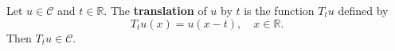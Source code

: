 Let $u \in \mathcal{C}$ and $t \in \mathbb{R}$. The \textbf{translation} of $u$ by $t$ is the function $T_t u$ defined by
$$T_t u(x) = u(x - t), \quad x \in \mathbb{R}.$$
Then $T_t u \in \mathcal{C}$.
